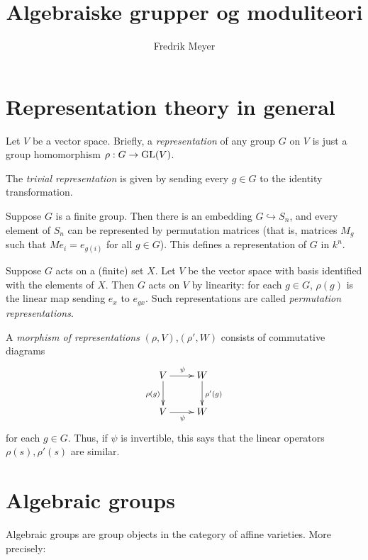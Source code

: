\documentclass[11pt, norsk]{article}
\begin{document}
\title{Algebraiske grupper og moduliteori}
\author{Fredrik Meyer}
\maketitle 

\section{Representation theory in general}

Let $V$ be a vector space. Briefly, a \emph{representation} of any group $G$ on $V$ is just a group homomorphism $\rho:G \to \operatorname{GL}(V)$.

\begin{example}
The \emph{trivial representation} is given by sending every $g \in G$ to the identity transformation.
\end{example}

\begin{example}
Suppose $G$ is a finite group. Then there is an embedding $G \hookrightarrow S_n$, and every element of $S_n$ can be represented by permutation matrices (that is, matrices $M_g$ such that $Me_i=e_{g(i)}$ for all $g \in G$). This defines a representation of $G$ in $k^n$. 
\end{example}

\begin{example}
Suppose $G$ acts on a (finite) set $X$. Let $V$ be the vector space with basis identified with the elements of $X$. Then $G$ acts on $V$ by linearity: for each $g \in G$, $\rho(g)$ is the linear map sending $e_x$ to $e_{gx}$. Such representations are called \emph{permutation representations}.
\end{example}

A \emph{morphism of representations} $(\rho,V)$,$(\rho',W)$ consists of commutative diagrams
\[
\xymatrix{
V \ar[r]^{\psi} \ar[d]_{\rho(g)}& W \ar[d]^{\rho'(g)} \\
V \ar[r]_{\psi} & W
}
\]
for each $g \in G$. Thus, if $\psi$ is invertible, this says that the linear operators $\rho(s),\rho'(s)$ are similar.

\section{Algebraic groups}

Algebraic groups are group objects in the category of affine varieties. More precisely:
\end{document}

